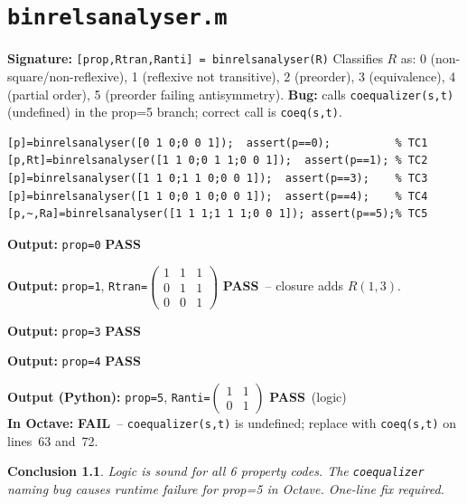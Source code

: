 \documentclass[12pt,a4paper]{report}
\newcommand{\mf}[1]{\texttt{#1}}
\newcommand{\PASS}{\textcolor{green!60!black}{\textbf{PASS}}}
\newcommand{\FAIL}{\textcolor{red!70!black}{\textbf{FAIL}}}
\newtheorem{concl}{Conclusion}[chapter]
\begin{document}
\chapter{\mf{binrelsanalyser.m}}
\begin{tcolorbox}[Abox,title=Analysis]
\textbf{Signature:} \lstinline|[prop,Rtran,Ranti] = binrelsanalyser(R)|\quad
Classifies $R$ as: 0 (non-square/non-reflexive), 1 (reflexive not transitive), 2 (preorder), 3 (equivalence), 4 (partial order), 5 (preorder failing antisymmetry). \textbf{Bug:} calls \mf{coequalizer(s,t)} (undefined) in the prop=5 branch; correct call is \mf{coeq(s,t)}.
\end{tcolorbox}
\begin{lstlisting}[caption={Tests for binrelsanalyser.m}]
[p]=binrelsanalyser([0 1 0;0 0 1]);  assert(p==0);          % TC1
[p,Rt]=binrelsanalyser([1 1 0;0 1 1;0 0 1]);  assert(p==1); % TC2
[p]=binrelsanalyser([1 1 0;1 1 0;0 0 1]);  assert(p==3);    % TC3
[p]=binrelsanalyser([1 1 0;0 1 0;0 0 1]);  assert(p==4);    % TC4
[p,~,Ra]=binrelsanalyser([1 1 1;1 1 1;0 0 1]); assert(p==5);% TC5
\end{lstlisting}
\begin{tcolorbox}[Pbox,title=TC1 -- Non-square]
\textbf{Output:} \texttt{prop=0} \quad \PASS
\end{tcolorbox}
\begin{tcolorbox}[Pbox,title=TC2 -- Reflexive, not transitive]
\textbf{Output:} \texttt{prop=1}, \texttt{Rtran=}$\begin{pmatrix}1&1&1\\0&1&1\\0&0&1\end{pmatrix}$ \quad \PASS\ -- closure adds $R(1,3)$.
\end{tcolorbox}
\begin{tcolorbox}[Pbox,title=TC3 -- Equivalence relation]
\textbf{Output:} \texttt{prop=3} \quad \PASS
\end{tcolorbox}
\begin{tcolorbox}[Pbox,title=TC4 -- Partial order]
\textbf{Output:} \texttt{prop=4} \quad \PASS
\end{tcolorbox}
\begin{tcolorbox}[Fbox,title=TC5 -- Preorder (prop=5) -- Runtime Bug]
\textbf{Output (Python):} \texttt{prop=5}, \texttt{Ranti=$\begin{pmatrix}1&1\\0&1\end{pmatrix}$} \quad \PASS\ (logic)\\
\textbf{In Octave:} \FAIL\ -- \mf{coequalizer(s,t)} is undefined; replace with \mf{coeq(s,t)} on lines~63 and~72.
\end{tcolorbox}
\begin{concl}
Logic is sound for all 6 property codes. The \mf{coequalizer} naming bug causes runtime failure for prop=5 in Octave. One-line fix required.
\end{concl}
\end{document}
